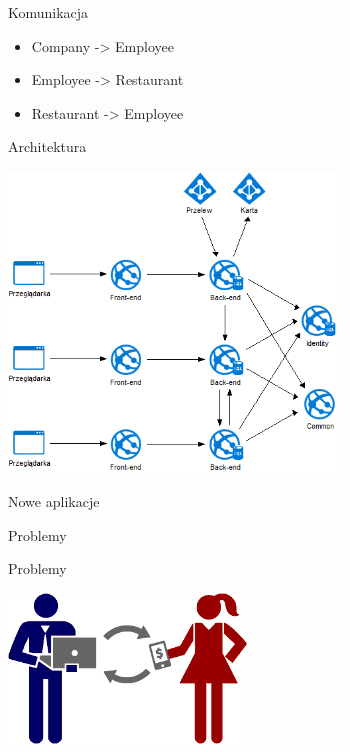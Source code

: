 \documentclass{beamer}
\begin{document}
\begin{frame}{Komunikacja}
	\begin{huge}
		\begin{itemize}[<+->]
			\item Company -> Employee
			\item Employee -> Restaurant
			\item Restaurant -> Employee
		\end{itemize}
	\end{huge}
\end{frame}

\begin{frame}{Architektura}
	\begin{center}
		\includegraphics[height=8cm]{architektura3.png}
	\end{center}
\end{frame}

\begin{frame}{Nowe aplikacje}
	\begin{center}
		\Huge{Problemy}
	\end{center}
\end{frame}

\begin{frame}{Problemy}
	\begin{center}
		\includegraphics[height=4cm]{pay1.png}
	\end{center}
\end{frame}
\end{document}

